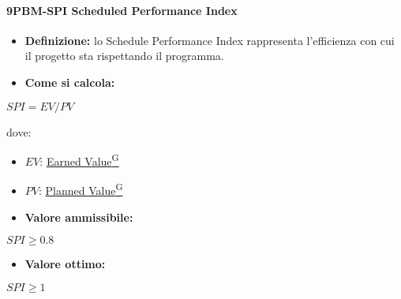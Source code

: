\paragraph*{9PBM-SPI Scheduled Performance Index}
\begin{itemize}
    \item \textbf{Definizione:} lo Schedule Performance Index rappresenta l’efficienza con cui il progetto sta rispettando il programma.
    \item \textbf{Come si calcola:}
\end{itemize}
\begin{center}
   $SPI = EV/PV$ 
\end{center}
dove:
\begin{itemize}[label=$\rightarrow$]
    \item $EV$: \href{https://code7crusaders.github.io/docs/PB/documentazione_interna/glossario.html#earned-value}{Earned Value\textsuperscript{G}}
    \item $PV$: \href{https://code7crusaders.github.io/docs/PB/documentazione_interna/glossario.html#planned-value}{Planned Value\textsuperscript{G}}
\end{itemize}
\begin{itemize}
    \item \textbf{Valore ammissibile:}
\end{itemize}
\begin{center}
    $SPI \geq 0.8$
\end{center}
\begin{itemize}
    \item \textbf{Valore ottimo:}
\end{itemize}
\begin{center}
    $SPI \geq 1$
\end{center}

